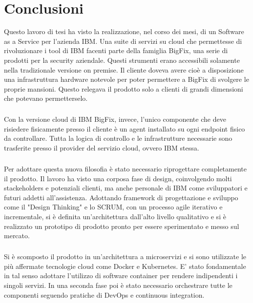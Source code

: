 \chapter{Conclusioni}

Questo lavoro di tesi ha visto la realizzazione, nel corso dei mesi, di un Software as a Service per l'azienda IBM. Una suite di servizi su cloud che permettesse di rivoluzionare i tool di IBM facenti parte della famiglia BigFix, una serie di prodotti per la security aziendale. Questi strumenti erano accessibili solamente nella tradizionale versione on premise. Il cliente doveva avere cioè  a disposizione una infrastruttura hardware notevole per poter permettere a BigFix di svolgere le proprie mansioni. Questo relegava il prodotto solo a clienti di grandi dimensioni che potevano permetterselo. 
\paragraph{}
Con la versione cloud di IBM BigFix, invece, l'unico componente che deve risiedere fisicamente presso il cliente è un agent installato su ogni endpoint fisico da controllare. Tutta la logica di controllo e le infrastrutture necessarie sono trasferite presso il provider del servizio cloud, ovvero IBM stessa.

\paragraph{}
Per adottare questa nuova filosofia è stato necessario riprogettare completamente il prodotto. Il lavoro ha visto una corposa fase di design, coinvolgendo molti stackeholders e potenziali clienti, ma anche personale di IBM come sviluppatori e futuri addetti all'assistenza. Adottando framework di progettazione e sviluppo come il "Design Thinking" e lo SCRUM, con un processo agile iterativo e incrementale, si è definita un'architettura dall'alto livello qualitativo e si è realizzato un prototipo di prodotto pronto per essere sperimentato e messo sul mercato.
\paragraph{}
Si è scomposto il prodotto in un'architettura a microservizi e si sono utilizzate le più affermate tecnologie cloud come Docker e Kubernetes. E' stato fondamentale in tal senso adottare l'utilizzo di software container per rendere indipendenti i singoli servizi. In una seconda fase poi è stato necessario orchestrare tutte le componenti seguendo pratiche di DevOps e continuous integration.

